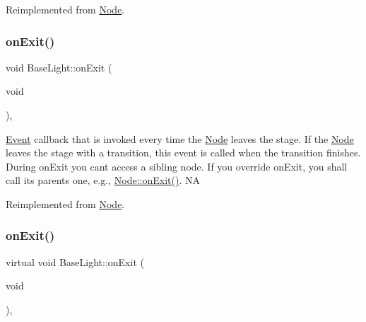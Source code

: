 Reimplemented from \hyperlink{classNode_a7f51764c4afd5018a052b9ef71c03374}{Node}.

\mbox{\label{classBaseLight_a4a38c4061703339cee94ebf523b453a0}} 
\subsubsection{\texorpdfstring{on\+Exit()}{onExit()}\hspace{0.1cm}{\footnotesize\ttfamily [1/2]}}
{\footnotesize\ttfamily void Base\+Light\+::on\+Exit (\begin{DoxyParamCaption}\item[{void}]{ }\end{DoxyParamCaption})\hspace{0.3cm}{\ttfamily [override]}, {\ttfamily [virtual]}}

\hyperlink{classEvent}{Event} callback that is invoked every time the \hyperlink{classNode}{Node} leaves the \textquotesingle{}stage\textquotesingle{}. If the \hyperlink{classNode}{Node} leaves the \textquotesingle{}stage\textquotesingle{} with a transition, this event is called when the transition finishes. During on\+Exit you can\textquotesingle{}t access a sibling node. If you override on\+Exit, you shall call its parent\textquotesingle{}s one, e.\+g., \hyperlink{classNode_ac83de835ea315e3179d4293acd8903ac}{Node\+::on\+Exit()}.  NA 

Reimplemented from \hyperlink{classNode_ac83de835ea315e3179d4293acd8903ac}{Node}.

\mbox{\label{classBaseLight_ab2287f5f40ce71824cfb5577a0874b07}} 
\subsubsection{\texorpdfstring{on\+Exit()}{onExit()}\hspace{0.1cm}{\footnotesize\ttfamily [2/2]}}
{\footnotesize\ttfamily virtual void Base\+Light\+::on\+Exit (\begin{DoxyParamCaption}\item[{void}]{ }\end{DoxyParamCaption})\hspace{0.3cm}{\ttfamily [override]}, {\ttfamily [virtual]}}

